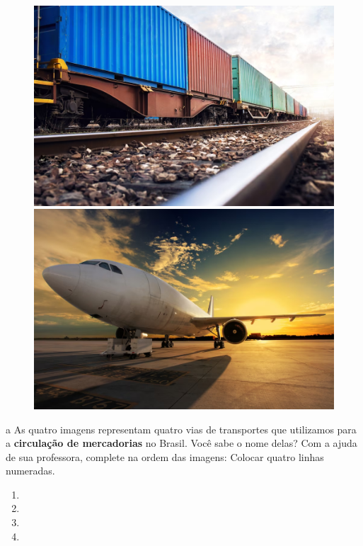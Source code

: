 \begin{figure}[htpb!]
\includegraphics[width=.5\textwidth]{./imgs/img62.png}
\includegraphics[width=.5\textwidth]{./imgs/img63.png}
\end{figure}





\num{a} As quatro imagens representam quatro vias de transportes que utilizamos
para a \textbf{circulação de mercadorias} no Brasil. Você sabe o nome
delas? Com a ajuda de sua professora, complete na ordem das imagens:
Colocar quatro linhas numeradas.

\begin{enumerate}
\item \preencher {}

\item \preencher {}

\item \preencher {}

\item \preencher {}

\end{enumerate}

